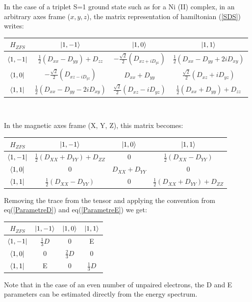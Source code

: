 \documentclass[12pt]{report}
\numberwithin{equation}{section}
\begin{document}
In the case of a triplet S=1 ground state such as for a Ni (II) complex, in an arbitrary axes frame ($x,y,z$), the matrix representation of hamiltonian (\ref{SDS}) writes:
\begin{center}
    \begin{tabular}{ c | c c c}
        $H_{ZFS}$ & $\ket{1,-1}$ & $\ket{1,0} $& $\ket{1,1}$ \\
        \hline
        $\bra{1,-1} $&  $\frac{1}{2}(D_{xx}-D_{yy})+D_{zz}$ & $-\frac{\sqrt{2}}{2}(D_{xz+iD_{yz}}) $ & $\frac{1}{2}(D_{xx}-D_{yy}+2iD_{xy})$ \\
        $\bra{1,0}$ & $-\frac{\sqrt{2}}{2}(D_{xz-iD_{yz}})  $& $ D_{xx}+D_{yy}  $&$ \frac{\sqrt{2}}{2}(D_{xz}+iD_{yz})$ \\
        $\bra{1,1} $& $ \frac{1}{2}(D_{xx}-D_{yy}-2iD_{xy}) $& $\frac{\sqrt{2}}{2}(D_{xz}-iD_{yz})$  & $\frac{1}{2}(D_{xx}+D_{yy})+D_{zz} $ \\
    \end{tabular}\\
\end{center}
In the magnetic axes frame (X, Y, Z), this matrix becomes:
\begin{center}
\begin{tabular}{c | c c c}
    $H_{ZFS}$ & $\ket{1,-1}$ & $\ket{1,0} $& $\ket{1,1}$ \\
    \hline
    $\bra{1,-1}$ & $\frac{1}{2}(D_{XX}+D_{YY})+D_{ZZ}$ & 0 & $\frac{1}{2}(D_{XX}-D_{YY})$\\
    $\bra{1,0}$ & 0 & $D_{XX}+D_{YY}$ & 0\\
    $\bra{1,1}$ &  $\frac{1}{2}(D_{XX}-D_{YY})$ & 0 & $\frac{1}{2}(D_{XX}+D_{YY})+D_{ZZ}$
\end{tabular}
\end{center}
Removing the trace from the tensor and applying the convention from eq(\ref{ParametreD}) and eq(\ref{ParametreE}) we get:
\begin{center}
\begin{tabular}{c | c c c}
    $H_{ZFS}$ & $\ket{1,-1}$ & $\ket{1,0}$ & $\ket{1,1}$\\
    \hline
    $\bra{1,-1}$ & $\frac{1}{3}D$ & 0 & E\\
    $\bra{1,0}$ & 0 & $\frac{2}{3}D $& 0\\
    $\bra{1,1}$ & E & 0 & $\frac{1}{3}D$
\end{tabular}
\end{center}
Note that in the case of an even number of unpaired electrons, the D and E parameters can be estimated directly from the energy spectrum.
\end{document}

